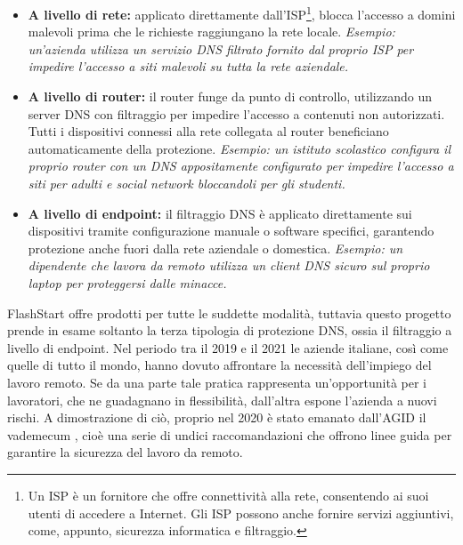 \documentclass[12pt,a4paper,openright,twoside]{book}
\begin{document}
\begin{itemize}
	\item \textbf{A livello di rete:} applicato direttamente dall'\gls{ISP}\footnote{
		Un \gls{ISP} è un fornitore che offre connettività alla rete, consentendo ai suoi utenti di accedere a Internet. Gli ISP possono anche fornire servizi aggiuntivi, come, appunto, sicurezza informatica e filtraggio.}, blocca l'accesso a domini malevoli prima che le richieste raggiungano la rete locale.  
	\newline \textit{Esempio: un'azienda utilizza un servizio \gls{DNS} filtrato fornito dal proprio \gls{ISP} per impedire l'accesso a siti malevoli su tutta la rete aziendale.}
	
	\item \textbf{A livello di router:} il router funge da punto di controllo, utilizzando un server DNS con filtraggio per impedire l'accesso a contenuti non autorizzati. Tutti i dispositivi connessi alla rete collegata al router beneficiano automaticamente della protezione.
	\newline \textit{Esempio: un istituto scolastico configura il proprio router con un DNS appositamente configurato per impedire l'accesso a siti per adulti e social network bloccandoli per gli studenti.}
	
	\item \textbf{A livello di endpoint:} il filtraggio DNS è applicato direttamente sui dispositivi tramite configurazione manuale o software specifici, garantendo protezione anche fuori dalla rete aziendale o domestica.  
	\newline \textit{Esempio: un dipendente che lavora da remoto utilizza un client DNS sicuro sul proprio laptop per proteggersi dalle minacce.}
\end{itemize}

FlashStart offre prodotti per tutte le suddette modalità, tuttavia questo progetto prende in esame soltanto la terza tipologia di protezione \gls{DNS}, ossia il filtraggio a livello di endpoint.
Nel periodo tra il 2019 e il 2021 le aziende italiane, così come quelle di tutto il mondo, hanno dovuto affrontare la necessità dell'impiego del lavoro remoto.
Se da una parte tale pratica rappresenta un'opportunità per i lavoratori, che ne guadagnano in flessibilità, dall'altra espone l'azienda a nuovi rischi.
A dimostrazione di ciò, proprio nel 2020 è stato emanato dall'\gls{AGID} il vademecum \cite{AgID2020}, cioè una serie di undici raccomandazioni che offrono linee guida per garantire la sicurezza del lavoro da remoto.
\end{document}

